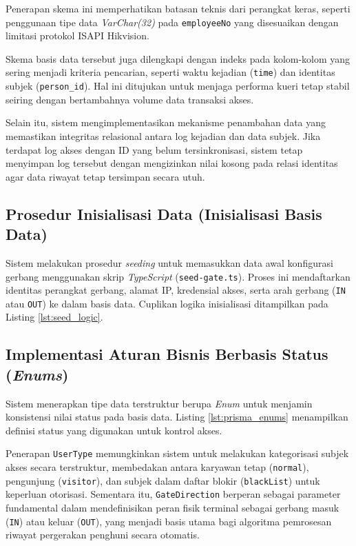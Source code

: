Penerapan skema ini memperhatikan batasan teknis dari perangkat keras, seperti penggunaan tipe data \textit{VarChar(32)} pada \texttt{employeeNo} yang disesuaikan dengan limitasi protokol ISAPI Hikvision.

Skema basis data tersebut juga dilengkapi dengan indeks pada kolom-kolom yang sering menjadi kriteria pencarian, seperti waktu kejadian (\texttt{time}) dan identitas subjek (\texttt{person\_id}). Hal ini ditujukan untuk menjaga performa kueri tetap stabil seiring dengan bertambahnya volume data transaksi akses.

Selain itu, sistem mengimplementasikan mekanisme penambahan data yang memastikan integritas relasional antara log kejadian dan data subjek. Jika terdapat log akses dengan ID yang belum tersinkronisasi, sistem tetap menyimpan log tersebut dengan mengizinkan nilai kosong pada relasi identitas agar data riwayat tetap tersimpan secara utuh.

\subsection{Prosedur Inisialisasi Data (Inisialisasi Basis Data)}
Sistem melakukan prosedur \textit{seeding} untuk memasukkan data awal konfigurasi gerbang menggunakan skrip \textit{TypeScript} (\texttt{seed-gate.ts}). Proses ini mendaftarkan identitas perangkat gerbang, alamat IP, kredensial akses, serta arah gerbang (\texttt{IN} atau \texttt{OUT}) ke dalam basis data. Cuplikan logika inisialisasi ditampilkan pada Listing \ref{lst:seed_logic}.



\subsection{Implementasi Aturan Bisnis Berbasis Status (\textit{Enums})}
Sistem menerapkan tipe data terstruktur berupa \textit{Enum} untuk menjamin konsistensi nilai status pada basis data. Listing \ref{lst:prisma_enums} menampilkan definisi status yang digunakan untuk kontrol akses.



Penerapan \texttt{UserType} memungkinkan sistem untuk melakukan kategorisasi subjek akses secara terstruktur, membedakan antara karyawan tetap (\texttt{normal}), pengunjung (\texttt{visitor}), dan subjek dalam daftar blokir (\texttt{blackList}) untuk keperluan otorisasi. Sementara itu, \texttt{GateDirection} berperan sebagai parameter fundamental dalam mendefinisikan peran fisik terminal sebagai gerbang masuk (\texttt{IN}) atau keluar (\texttt{OUT}), yang menjadi basis utama bagi algoritma pemrosesan riwayat pergerakan penghuni secara otomatis.

